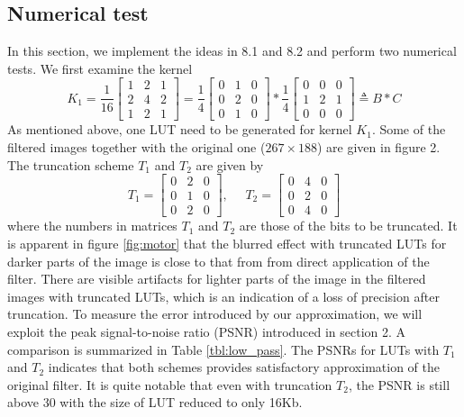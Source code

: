 \documentclass[12pt]{amsart}
\theoremstyle{definition}
\theoremstyle{remark}
\numberwithin{thm}{section}
\begin{document}
\subsection{Numerical test}
In this section, we implement the ideas in 8.1 and 8.2 and perform two numerical tests. We first examine the kernel
$$
K_1=\frac{1}{16}
\begin{bmatrix}
1 & 2 & 1\\
2 & 4 & 2\\
1 & 2 & 1
\end{bmatrix}
=
\frac{1}{4}
\begin{bmatrix}
0 & 1 & 0\\
0 & 2 & 0\\
0 & 1 & 0
\end{bmatrix}*\frac{1}{4}
\begin{bmatrix}
0 & 0 & 0\\
1 & 2 & 1\\
0 & 0 & 0
\end{bmatrix}\triangleq B*C
$$
As mentioned above, one LUT need to be generated for kernel $K_1$. Some of the filtered images together with the original one ($267\times 188$) are given in figure 2. The truncation scheme $T_1$ and $T_2$ are given by 
$$
T_1=
\begin{bmatrix}
0 & 2 & 0\\
0 & 1 & 0\\
0 & 2 & 0
\end{bmatrix}
,\ \ \ \ \ \ T_2=
\begin{bmatrix}
0 & 4 & 0\\
0 & 2 & 0\\
0 & 4 & 0
\end{bmatrix}
$$
where the numbers in matrices $T_1$ and $T_2$ are those of the bits to be truncated. It is apparent in figure \ref{fig:motor} that the blurred effect with truncated LUTs for darker parts of the image is close to that from from direct application of the filter. There are visible artifacts for lighter parts of the image in the filtered images with truncated LUTs, which is an indication of a loss of precision after truncation. To measure the error introduced by our approximation, we will exploit the peak signal-to-noise ratio (PSNR) introduced in section 2. A comparison is summarized in Table \ref{tbl:low_pass}. The PSNRs for LUTs with $T_1$ and $T_2$ indicates that both schemes provides satisfactory approximation of the original filter. It is quite notable that even with truncation $T_2$, the PSNR is still above 30 with the size of LUT reduced to only 16Kb. 
\end{document}
